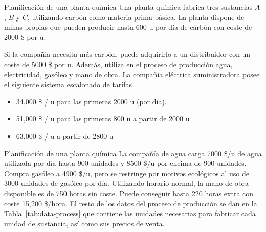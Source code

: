 \documentclass[../../main.tex]{subfiles}
\begin{document}
\begin{frame}{Planificación de una planta química}{}
  Una planta química fabrica tres sustancias $A$, $B$ y $C$, utilizando carbón como materia prima básica. La planta dispone de minas propias que pueden producir hasta 600 u por día de cárbón con coste de 2000 \$ por u.

  Si la compañia necesita más carbón, puede adquirirlo a un distribuidor con un coste de 5000 \$ por u. Además, utiliza en el proceso de producción agua, electricidad, gasóleo y mano de obra. La compañía eléctrica suministradora posee el siguiente sistema escalonado de tarifas

  \begin{itemize}
\item 34,000 \$ / u para las primeras 2000 u (por día).
\item 51,000 \$ / u para las primeras 800 u a partir de 2000 u
\item 63,000 \$ / u a partir de 2800 u
\end{itemize}


\end{frame}

\begin{frame}{Planificación de una planta química}{}
  La compañía de agua carga 7000 \$/u de agua utilizada por día hasta 900 unidades y 8500 \$/u por encima de 900 unidades. Compra gasóleo a 4900 \$/u, pero se restringe por motivos ecológicos al uso de 3000 unidades de gasóleo por día. Utilizando horario normal, la mano de obra disponible es de 750 horas sin coste. Puede conseguir hasta 220 horas extra con coste 15,200 \$/hora. El resto de los datos del proceso de producción se dan en la Tabla~\ref{tab:data-process} que contiene las unidades necesarias para fabricar cada unidad de sustancia, así como sus precios de venta.

\end{frame}
\end{document}

